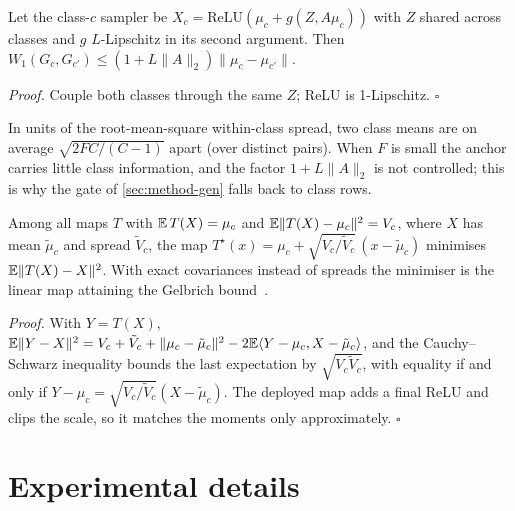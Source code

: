 \begin{lemma}\label{prop:w1}
Let the class-$c$ sampler be $X_c=\mathrm{ReLU}(\mu_c+g(Z,A\mu_c))$ with $Z$ shared across classes and $g$
$L$-Lipschitz in its second argument. Then $W_1(G_c,G_{c'})\le(1+L\|A\|_2)\|\mu_c-\mu_{c'}\|$.
\end{lemma}
\emph{Proof.} Couple both classes through the same $Z$; ReLU is 1-Lipschitz. \hfill$\square$

In units of the root-mean-square within-class spread, two class means are on average $\sqrt{2FC/(C-1)}$ apart (over
distinct pairs). When $F$ is small the anchor carries little class information, and the factor $1+L\|A\|_2$ is not
controlled; this is why the gate of \cref{sec:method-gen} falls back to class rows.

\begin{lemma}\label{prop:mc}
Among all maps $T$ with $\mathbb{E}\,T(X)=\mu_c$ and $\mathbb{E}\|T(X)-\mu_c\|^2=V_c$, where $X$ has mean $\tilde\mu_c$ and spread $\tilde V_c$,
the map $T^\star(x)=\mu_c+\sqrt{V_c/\tilde V_c}\,(x-\tilde\mu_c)$ minimises $\mathbb{E}\|T(X)-X\|^2$. With exact covariances instead of
spreads the minimiser is the linear map attaining the Gelbrich bound~\cite{gelbrich1990}.
\end{lemma}
\emph{Proof.} With $Y=T(X)$, $\mathbb{E}\|Y-X\|^2=V_c+\tilde V_c+\|\mu_c-\tilde\mu_c\|^2-2\mathbb{E}\langle Y-\mu_c,X-\tilde\mu_c\rangle$, and the
Cauchy--Schwarz inequality bounds the last expectation by $\sqrt{V_c\tilde V_c}$, with equality if and only if
$Y-\mu_c=\sqrt{V_c/\tilde V_c}(X-\tilde\mu_c)$. The deployed map adds a final ReLU and clips the scale, so it matches the
moments only approximately. \hfill$\square$

\section{Experimental details}\label{app:protocol}

